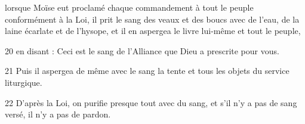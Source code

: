 lorsque Moïse eut proclamé chaque commandement à tout le peuple conformément à la Loi, il prit le sang des veaux et des boucs avec de l’eau, de la laine écarlate et de l’hysope, et il en aspergea le livre lui-même et tout le peuple,

20 en disant : Ceci est le sang de l’Alliance que Dieu a prescrite pour vous.

21 Puis il aspergea de même avec le sang la tente et tous les objets du service liturgique.

22 D’après la Loi, on purifie presque tout avec du sang, et s’il n’y a pas de sang versé, il n’y a pas de pardon.